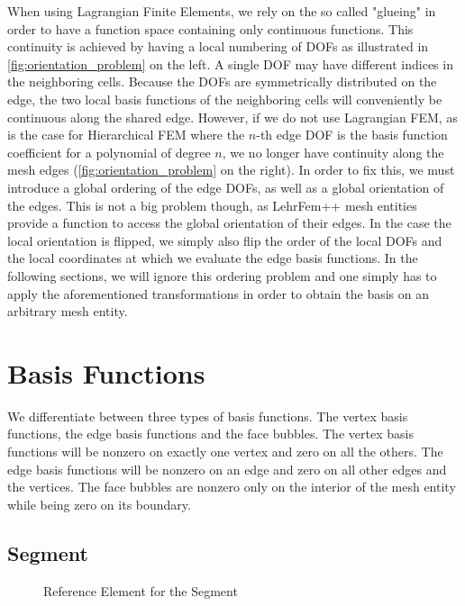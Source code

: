 \documentclass[10pt,a4paper]{article}
\begin{document}
    When using Lagrangian Finite Elements, we rely on the so called "glueing" in order to have a function space containing only continuous functions. This continuity is achieved by having a local numbering of DOFs as illustrated in \autoref{fig:orientation_problem} on the left. A single DOF may have different indices in the neighboring cells. Because the DOFs are symmetrically distributed on the edge, the two local basis functions of the neighboring cells will conveniently be continuous along the shared edge. However, if we do not use Lagrangian FEM, as is the case for Hierarchical FEM where the $n$-th edge DOF is the basis function coefficient for a polynomial of degree $n$, we no longer have continuity along the mesh edges (\autoref{fig:orientation_problem} on the right). In order to fix this, we must introduce a global ordering of the edge DOFs, as well as a global orientation of the edges. This is not a big problem though, as LehrFem++ mesh entities provide a function to access the global orientation of their edges. In the case the local orientation is flipped, we simply also flip the order of the local DOFs and the local coordinates at which we evaluate the edge basis functions. In the following sections, we will ignore this ordering problem and one simply has to apply the aforementioned transformations in order to obtain the basis on an arbitrary mesh entity.


\section{Basis Functions}

    We differentiate between three types of basis functions. The vertex basis functions, the edge basis functions and the face bubbles. The vertex basis functions will be nonzero on exactly one vertex and zero on all the others. The edge basis functions will be nonzero on an edge and zero on all other edges and the vertices. The face bubbles are nonzero only on the interior of the mesh entity while being zero on its boundary.


\subsection{Segment}

    \begin{figure}[ht!]
        \center
        \caption{Reference Element for the Segment}
        \label{fig:ref_segment}
    \end{figure}
    
\end{document}
